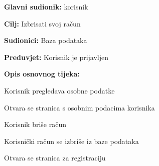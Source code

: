 					\noindent {}
					\begin{packed_item}
	
						\item \textbf{Glavni sudionik: }korisnik
						\item  \textbf{Cilj:} Izbrisati svoj račun
						\item  \textbf{Sudionici:} Baza podataka
						\item  \textbf{Preduvjet:} Korisnik je prijavljen
						\item  \textbf{Opis osnovnog tijeka:}
						
						\item[] \begin{packed_enum}
	
							\item Korisnik pregledava osobne podatke
							\item Otvara se stranica s osobnim podacima korisnika
							\item Korisnik briše račun
							\item Korisnički račun se izbriše iz baze podataka
							\item Otvara se stranica za registraciju

						\end{packed_enum}
				
					\end{packed_item}
					
